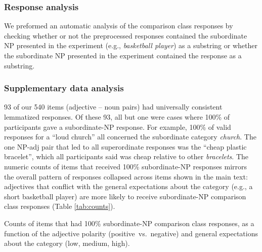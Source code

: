 \documentclass[doc]{apa6}
\begin{document}
\subsubsection{Response analysis}

We preformed an automatic analysis of the comparison class responses by checking whether or not the preprocessed responses  contained the subordinate NP presented in the experiment (e.g., \emph{basketball player}) as a substring or whether the subordinate NP presented in the experiment contained the response as a substring. 

\subsubsection{Supplementary data analysis}

93 of our 540 items (adjective -- noun pairs) had universally consistent lemmatized responses. 
Of these 93, all but one were cases where 100\% of participants gave a subordinate-NP response. 
For example, 100\% of valid responses for a ``loud church'' all concerned the subordinate category \emph{church}. 
The one NP-adj pair that led to all superordinate responses was the ``cheap plastic bracelet'', which all participants said was cheap relative to other \emph{bracelets}. 
The numeric counts of items that received 100\% subordinate-NP responses mirrors the overall pattern of responses collapsed across items shown in the main text: adjectives that conflict with the general expectations about the category (e.g., a short basketball player) are more likely to receive subordinate-NP comparison class responses (Table \ref{tab:counts}). 




\begin{center}
  \begin{table}[h]
    \centering
    \caption{Counts of items that had 100\% subordinate-NP comparison class responses, as a function of the adjective polarity (positive~vs.~negative) and general expectations about the category (low, medium, high).}
    \label{tab:counts}
  \end{table}
\end{center}
\end{document}
